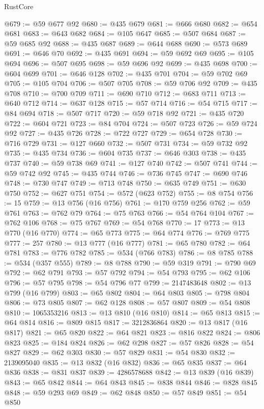 \begin{lexlean}{RustCore}
\begin{coremodule}
@679 := @59 @677 @92
@680 := @435 @679
@681 := @666 @680
@682 := @654 @681
@683 := @643 @682
@684 := @105 @647
@685 := @507 @684
@687 := @59 @685 @92
@688 := @435 @687
@689 := @644 @688
@690 := @573 @689
@691 := @646 @70
@692 := @435 @691
@694 := @59 @692 @69
@695 := @105 @694
@696 := @507 @695
@698 := @59 @696 @92
@699 := @435 @698
@700 := @604 @699
@701 := @646 @128
@702 := @435 @701
@704 := @59 @702 @69
@705 := @105 @704
@706 := @507 @705
@708 := @59 @706 @92
@709 := @435 @708
@710 := @700 @709
@711 := @690 @710
@712 := @683 @711
@713 := @640 @712
@714 := @637 @128
@715 := @57 @714
@716 := @54 @715
@717 := @84 @694
@718 := @507 @717
@720 := @59 @718 @92
@721 := @435 @720
@722 := @604 @721
@723 := @84 @704
@724 := @507 @723
@726 := @59 @724 @92
@727 := @435 @726
@728 := @722 @727
@729 := @654 @728
@730 := @716 @729
@731 := @127 @660
@732 := @507 @731
@734 := @59 @732 @92
@735 := @435 @734
@736 := @604 @735
@737 := @646 @303
@738 := @435 @737
@740 := @59 @738 @69
@741 := @127 @740
@742 := @507 @741
@744 := @59 @742 @92
@745 := @435 @744
@746 := @736 @745
@747 := @690 @746
@748 := @730 @747
@749 := @713 @748
@750 := @635 @749
@751 := @630 @750
@752 := @627 @751
@754 := @572 (@623 @752)
@755 := @8 @754
@756 := 15
@759 := @13 @756 (@16 @756)
@761 := @170 @759 @256
@762 := @59 @761
@763 := @762 @79
@764 := @75 @763
@766 := @54 @764 @104
@767 := @762 @106
@768 := @75 @767
@769 := @54 @768
@770 := 17
@773 := @13 @770 (@16 @770)
@774 := @65 @773
@775 := @64 @774
@776 := @769 @775
@777 := 257
@780 := @13 @777 (@16 @777)
@781 := @65 @780
@782 := @64 @781
@783 := @776 @782
@785 := @534 (@766 @783)
@786 := @8 @785
@788 := @534 (@357 @555)
@789 := @8 @788
@790 := @59 @319
@791 := @790 @69
@792 := @62 @791
@793 := @57 @792
@794 := @54 @793
@795 := @62 @106
@796 := @57 @795
@798 := @54 @796 @77
@799 := 2147483648
@802 := @13 @799 (@16 @799)
@803 := @65 @802
@804 := @64 @803
@805 := @798 @804
@806 := @73 @805
@807 := @62 @128
@808 := @57 @807
@809 := @54 @808
@810 := 1065353216
@813 := @13 @810 (@16 @810)
@814 := @65 @813
@815 := @64 @814
@816 := @809 @815
@817 := 3212836864
@820 := @13 @817 (@16 @817)
@821 := @65 @820
@822 := @64 @821
@823 := @816 @822
@824 := @806 @823
@825 := @184 @824
@826 := @62 @298
@827 := @57 @826
@828 := @54 @827
@829 := @62 @303
@830 := @57 @829
@831 := @54 @830
@832 := 2139095040
@835 := @13 @832 (@16 @832)
@836 := @65 @835
@837 := @64 @836
@838 := @831 @837
@839 := 4286578688
@842 := @13 @839 (@16 @839)
@843 := @65 @842
@844 := @64 @843
@845 := @838 @844
@846 := @828 @845
@848 := @59 @293 @69
@849 := @62 @848
@850 := @57 @849
@851 := @54 @850

\end{coremodule}
\end{lexlean}
